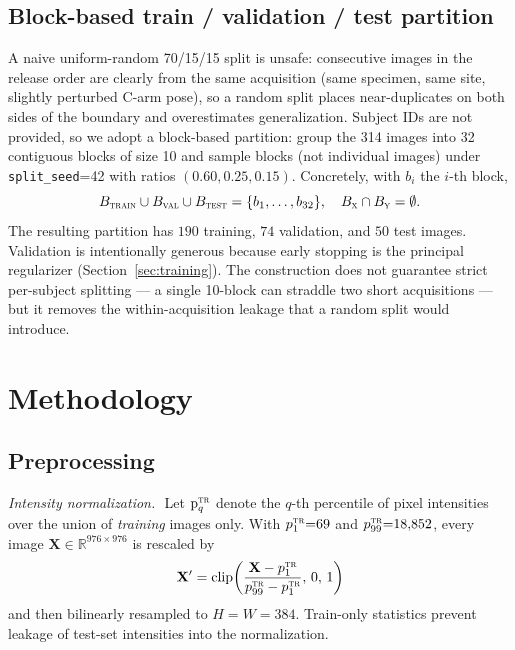 \documentclass[conference,10pt,letterpaper]{IEEEtran}
\begin{document}
\subsection{Block-based train / validation / test partition}
\label{sec:split}
A naive uniform-random 70/15/15 split is unsafe: consecutive images in the
release order are clearly from the same acquisition (same specimen, same
site, slightly perturbed C-arm pose), so a random split places
near-duplicates on both sides of the boundary and overestimates
generalization. Subject IDs are not provided, so we adopt a block-based
partition: group the 314 images into 32 contiguous blocks of size 10 and
sample blocks (not individual images) under \texttt{split\_seed}{=}42 with
ratios $(0.60,0.25,0.15)$. Concretely, with $b_i$ the $i$-th block,
\begin{equation}
  B_\textsc{train} \cup B_\textsc{val} \cup B_\textsc{test} = \{b_1,\dots,b_{32}\},\quad
  B_\textsc{x} \cap B_\textsc{y} = \emptyset.
\end{equation}
The resulting partition has $190$ training, $74$ validation, and $50$
test images. Validation is intentionally generous because early stopping
is the principal regularizer (Section~\ref{sec:training}). The
construction does not guarantee strict per-subject splitting --- a single
10-block can straddle two short acquisitions --- but it removes the
within-acquisition leakage that a random split would introduce.

\section{Methodology}
\label{sec:methods}

\subsection{Preprocessing}
\label{sec:preproc}
\emph{Intensity normalization.}\,\,
Let $\mathrm{p}_q^\textsc{tr}$ denote the $q$-th percentile of pixel
intensities over the union of \emph{training} images only. With $p_1^\textsc{tr}{=}69$
and $p_{99}^\textsc{tr}{=}18{,}852$, every image $\mathbf{X}\in\mathbb{R}^{976\times 976}$
is rescaled by
\begin{equation}
  \mathbf{X}' = \mathrm{clip}\!\left(\frac{\mathbf{X}-p_1^\textsc{tr}}
                                     {p_{99}^\textsc{tr}-p_1^\textsc{tr}},\,0,\,1\right)
\end{equation}
and then bilinearly resampled to $H{=}W{=}384$. Train-only statistics
prevent leakage of test-set intensities into the normalization.
\end{document}
